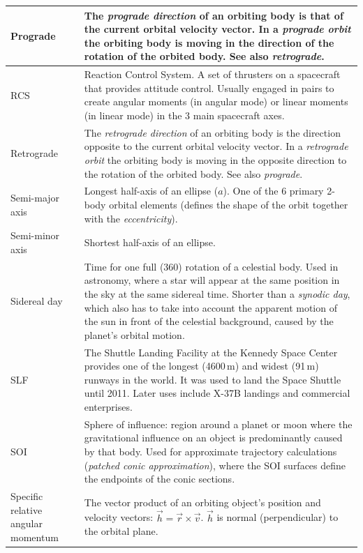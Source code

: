 \documentclass[Orbiter User Manual.tex]{subfiles}
\begin{document}
\begin{longtable}{ >{\RaggedRight}p{} p{} }
	\hline
	Prograde & The \emph{prograde direction} of an orbiting body is that of the
		current orbital velocity vector. In a \emph{prograde orbit} the orbiting
		body is moving in the direction of the rotation of the orbited body. See
		also \emph{retrograde}.\\
	\hline
	RCS & Reaction Control System. A set of thrusters on a spacecraft that
		provides attitude control. Usually engaged in pairs to create angular
		moments (in angular mode) or linear moments (in linear mode) in the 3
		main spacecraft axes.\\
	\hline
	Retrograde & The \textit{retrograde direction} of an orbiting body is the
		direction opposite to the current orbital velocity vector. In a
		\emph{retrograde orbit} the orbiting body is moving in the opposite
		direction to the rotation of the orbited body. See also
		\emph{prograde}.\\
	\hline
	Semi-major axis & Longest half-axis of an ellipse ($a$). One of the 6
		primary 2-body orbital elements (defines the shape of the orbit together
		with the \emph{eccentricity}).\\
	\hline
	Semi-minor axis & Shortest half-axis of an ellipse.\\
	\hline
	Sidereal day & Time for one full (360\deg{}) rotation of a celestial body.
		Used in astronomy, where a star will appear at the same position in the
		sky at the same sidereal time. Shorter than a \emph{synodic day}, which
		also has to take into account the apparent motion of the sun in front of
		the celestial background, caused by the planet's orbital motion.\\
	\hline
	SLF & The Shuttle Landing Facility at the Kennedy Space Center provides one
		of the longest (4600\,m) and widest (91\,m) runways in the world. It was
		used to land the Space Shuttle until 2011. Later uses include X-37B
		landings and commercial enterprises.\\
	\hline
	SOI & Sphere of influence: region around a planet or moon where the
		gravitational influence on an object is predominantly caused by that
		body. Used for approximate trajectory calculations (\emph{patched conic
		approximation}), where the SOI surfaces define the endpoints of the
		conic sections.\\
	\hline
	Specific relative angular momentum & The vector product of an orbiting
		object's position and velocity vectors:
		$\vec{h} = \vec{r} \times \vec{v}$. $\vec{h}$ is normal (perpendicular)
		to the orbital plane.\\

\end{longtable}
\end{document}
